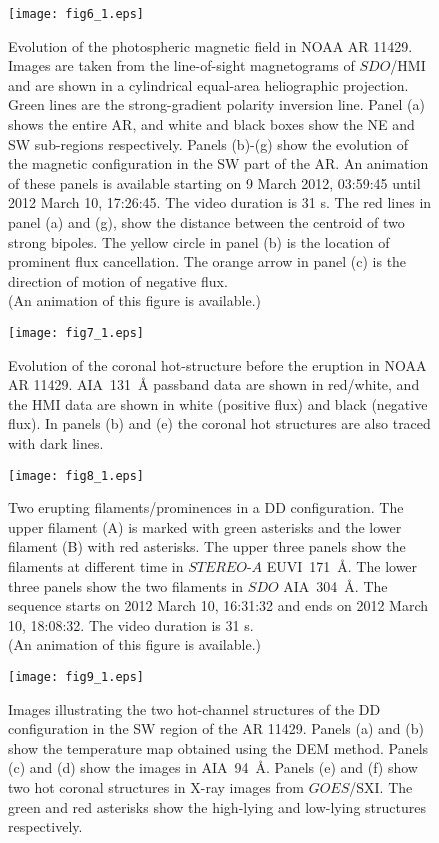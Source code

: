 \documentclass{aastex62}
\begin{document}
\begin{figure}[h]
\centering
\texttt{[image: fig6\_1.eps]}
\caption{Evolution of the photospheric magnetic field in NOAA AR 11429. Images are taken from the line-of-sight magnetograms of $\textit{SDO}$/HMI and are shown in a cylindrical equal-area heliographic projection. Green lines are the strong-gradient polarity inversion line. Panel (a) shows the entire AR, and white and black boxes show the NE and SW sub-regions respectively. Panels (b)-(g) show the evolution of the magnetic configuration in the SW part of the AR. An animation of these panels is available starting on 9 March 2012, 03:59:45 until 2012 March 10, 17:26:45. The video duration is 31 s. The red lines in panel (a) and (g), show the distance between the centroid of two strong bipoles. The yellow circle in panel (b) is the location of prominent flux cancellation. The orange arrow in panel (c) is the direction of motion of negative flux.\\
(An animation of this figure is available.)}
\label{fig:hmi_evo}
\end{figure}
\begin{figure}[h]
\centering
\texttt{[image: fig7\_1.eps]}
\caption{Evolution of the coronal hot-structure before the eruption in NOAA AR 11429. AIA~131~\AA{} passband data are shown in red/white, and the HMI data are shown in white (positive flux) and black (negative flux). In panels (b) and (e) the coronal hot structures are also traced with dark lines.}
\label{fig:c_evo}
\end{figure}


\begin{figure}[tb]
\centering
\texttt{[image: fig8\_1.eps]}
\caption{Two erupting filaments/prominences in a DD configuration. The upper filament (A) is marked with green asterisks and the lower filament (B) with red asterisks. The upper three panels show the filaments at different time in $\textit{STEREO-A}$ EUVI~171~\AA. The lower three panels show the two filaments in $\textit{SDO}$ AIA~304~\AA. The sequence starts on 2012 March 10, 16:31:32 and ends on 2012 March 10, 18:08:32. The video duration is 31 s.\\
(An animation of this figure is available.)}
\label{fig:config}
\end{figure}


\begin{figure}[h]
\centering
\texttt{[image: fig9\_1.eps]}
\caption{Images illustrating the two hot-channel structures of the DD configuration in the SW region of the AR 11429. Panels (a) and (b) show the temperature map obtained using the DEM method. Panels (c) and (d) show the images in AIA~94~\AA. Panels (e) and (f) show two hot coronal structures in X-ray images from $\textit{GOES}$/SXI. The green and red asterisks show the high-lying and low-lying structures respectively.}
\label{fig:hot_config}
\end{figure}
\end{document}
